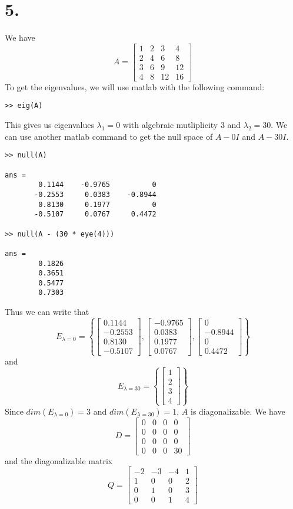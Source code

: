 \documentclass{article}
\begin{document}
\section*{5.}
	We have \[ A = \begin{bmatrix}1&2&3&4\\2&4&6&8\\3&6&9&12\\4&8&12&16\end{bmatrix} \] To get the eigenvalues, we will use matlab with the following command:
	\begin{verbatim}
>> eig(A)
	\end{verbatim}
	This gives us eigenvalues $\lambda_1 = 0$ with algebraic mutliplicity 3 and $\lambda_2 = 30$. We can use another matlab command to get the null space of $A - 0I$ and $A-30I$.
	\begin{verbatim}
>> null(A)

ans = 
        0.1144    -0.9765          0
       -0.2553     0.0383    -0.8944
        0.8130     0.1977          0
       -0.5107     0.0767     0.4472

>> null(A - (30 * eye(4)))

ans =
        0.1826
        0.3651
        0.5477
        0.7303
	\end{verbatim}
	Thus we can write that \[ E_{\lambda = 0} = \left \{ \begin{bmatrix}0.1144\\-0.2553\\0.8130\\-0.5107\end{bmatrix},  \begin{bmatrix}-0.9765\\0.0383\\0.1977\\0.0767\end{bmatrix},
	\begin{bmatrix}0\\-0.8944\\0\\0.4472\end{bmatrix} \right \} \] and \[ E_{\lambda = 30} = \left \{ \begin{bmatrix}1\\2\\3\\4\end{bmatrix} \right \} \]
	Since $dim(E_{\lambda = 0}) = 3$ and $dim(E_{\lambda = 30}) = 1$, $A$ is diagonalizable. We have \[ D = \begin{bmatrix}0&0&0&0\\0&0&0&0\\0&0&0&0\\0&0&0&30\end{bmatrix} \]
	and the diagonalizable matrix \[ Q = \begin{bmatrix}-2&-3&-4&1\\1&0&0&2\\0&1&0&3\\0&0&1&4\end{bmatrix} \]
\end{document}
